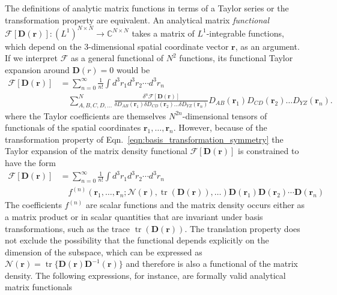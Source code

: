 \documentclass[journal=jacsat,manuscript=article]{achemso}
\DeclareMathOperator{\tr}{tr}
\newcommand\m[1]{\mathbf{#1}}
\renewcommand\vec[1]{\mathbf{#1}}
\begin{document}
The definitions of analytic matrix functions in terms of a Taylor series or the transformation property are equivalent. \cite{Rinehart1955} 
An analytical matrix \emph{functional} $\mathcal{F}[\m{D}(\vec{r})] : (L^1)^{N \times N} \to \mathbb{C}^{N \times N}$ takes a matrix of $L^1$-integrable functions, which depend on the 3-dimensional spatial coordinate vector $\vec{r}$, as an argument.
If we interpret $\mathcal{F}$ as a general functional of $N^2$ functions, its functional Taylor expansion around $\m{D}(r) = 0$ would be
\begin{equation}
  \begin{split}
    \mathcal{F}[\m{D}(\vec{r})] & = \sum_{n=0}^{\infty} \frac{1}{n!} \int d^3\!r_1 d^3\!r_2 \cdots d^3\!r_n ~ \\
    & \quad \sum_{A,B,C,D,\ldots}^{N} \frac{\delta^{n} \mathcal{F}[\m{D}(\vec{r})]}{\delta D_{AB}(\vec{r}_1) \delta D_{CD}(\vec{r}_2) \ldots \delta D_{YZ}(\vec{r}_n)} D_{AB}(\vec{r}_1) D_{CD}(\vec{r}_2) \ldots D_{YZ}(\vec{r}_n).
  \end{split}
\end{equation}
where the Taylor coefficients are themselves $N^{2 n}$-dimensional tensors of functionals of the spatial coordinates $\vec{r}_1,\ldots,\vec{r}_n$.
However, because of the transformation property of Eqn.~\ref{eqn:basis_transformation_symmetry} the Taylor expansion of the matrix density functional
$\mathcal{F}[\m{D}(\vec{r})]$ is constrained to have the form
\begin{equation}
 \begin{split}
   \mathcal{F}[\m{D}(\vec{r})] &= \sum_{n=0}^{\infty} \frac{1}{n!} \int d^3\!r_1 d^3\!r_2 \cdots d^3\!r_n ~ \\
   & \quad f^{(n)}(\vec{r}_1,\ldots,\vec{r}_n; \mathcal{N}(\vec{r}), \tr(\m{D}(\vec{r})), \ldots) \m{D}(\vec{r}_1) \m{D}(\vec{r}_2) \cdots \m{D}(\vec{r}_n) \label{eqn:functional_taylor_expansion}
 \end{split}
\end{equation}
The coefficients $f^{(n)}$ are scalar functions and the matrix density occurs either as a matrix product or in scalar quantities that are invariant under basis transformations, such as the trace $\tr(\mathbf{D}(\vec{r}))$. The translation property does not exclude the possibility that the functional depends explicitly on the dimension of the subspace, which can be expressed as $\mathcal{N}(\vec{r}) = \tr\{\m{D}(\vec{r}) \m{D}^{-1}(\vec{r})\}$ and therefore is also a functional of the matrix density.
The following expressions, for instance, are formally valid analytical matrix functionals
\end{document}
